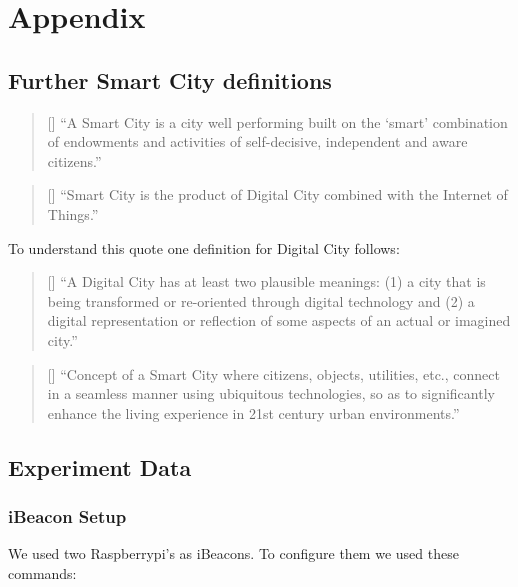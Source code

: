 


\renewcommand{\thesubsection}{\Alph{subsection}}

\section*{Appendix}

\subsection{Further Smart City definitions}

\begin{quote}[\textcite{smart1}]
“A Smart City is a city well performing built on the ‘smart’ combination of endowments and activities of self-decisive, independent and aware citizens.”
\end{quote}

\begin{quote}[\textcite{smart5}]
“Smart City is the product of Digital City combined with the Internet of Things.”
\end{quote} 

To understand this quote one definition for Digital City follows: 

\begin{quote}[\textcite{digital1}]
“A Digital City has at least two plausible meanings: (1) a city that is being transformed or re-oriented through digital technology and (2) a digital representation or reflection of some aspects of an actual or imagined city.” 
\end{quote}

\begin{quote}[\textcite{smart6}]
“Concept of a Smart City where citizens, objects, utilities, etc., connect in a seamless manner using ubiquitous technologies, so as to significantly enhance the living experience in 21st century urban environments.” 
\end{quote}


\subsection{Experiment Data}

\subsubsection{iBeacon Setup}

We used two Raspberrypi's as iBeacons. To configure them we used these commands:


